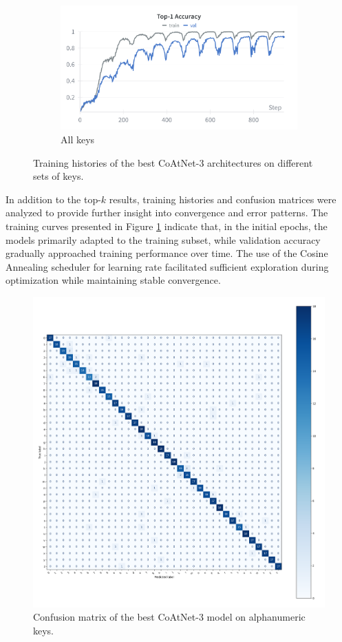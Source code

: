 \documentclass[a4paper,11pt,twoside]{report}
\theoremstyle{definition}
\begin{document}
\begin{figure}[h!]
\begin{subfigure}{\linewidth}
\begin{minipage}{0.45\linewidth}
    \end{minipage}
    \hfill
    \begin{minipage}{0.45\linewidth}
        \centering
        \includegraphics[width=\linewidth]{img_results/acc_all.png}
    \end{minipage}
    \caption{All keys}
\end{subfigure}

\caption{Training histories of the best CoAtNet-3 architectures on different sets of keys.}
\label{fig:training_histories}
\end{figure}

In addition to the top-$k$ results, training histories and confusion matrices were analyzed to provide further insight into convergence and error patterns. The training curves presented in Figure  \ref{fig:training_histories} indicate that, in the initial epochs, the models primarily adapted to the training subset, while validation accuracy gradually approached training performance over time. The use of the Cosine Annealing scheduler for learning rate facilitated sufficient exploration during optimization while maintaining stable convergence.


\begin{figure}[h!]
  \centering
  \includegraphics[width=0.65\linewidth]{img_results/cm_all_CoAtNet_alphanum.png}
  \caption{Confusion matrix of the best CoAtNet-3 model on alphanumeric keys.}
  \label{fig:confusion_matrix_alphanum}
\end{figure}
\end{document}
